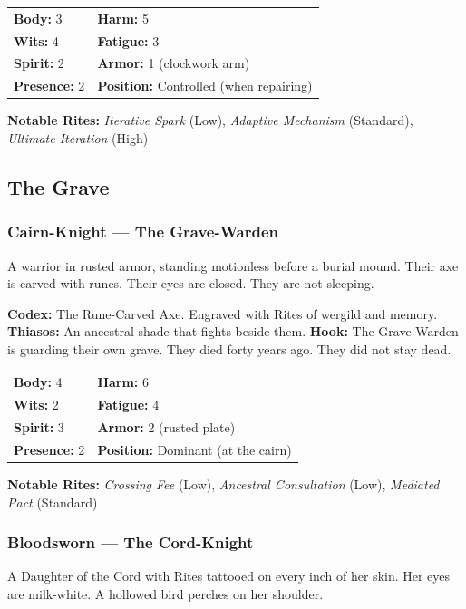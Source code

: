 \begin{tabular}{ll}
\textbf{Body:} 3 & \textbf{Harm:} 5 \\
\textbf{Wits:} 4 & \textbf{Fatigue:} 3 \\
\textbf{Spirit:} 2 & \textbf{Armor:} 1 (clockwork arm) \\
\textbf{Presence:} 2 & \textbf{Position:} Controlled (when repairing) \\
\end{tabular}

\textbf{Notable Rites:} \textit{Iterative Spark} (Low), \textit{Adaptive Mechanism} (Standard), \textit{Ultimate Iteration} (High)

\subsection{The Grave}

\subsubsection{Cairn-Knight — The Grave-Warden}

A warrior in rusted armor, standing motionless before a burial mound. Their axe is carved with runes. Their eyes are closed. They are not sleeping.

\textbf{Codex:} The Rune-Carved Axe. Engraved with Rites of wergild and memory.
\textbf{Thiasos:} An ancestral shade that fights beside them.
\textbf{Hook:} The Grave-Warden is guarding their own grave. They died forty years ago. They did not stay dead.

\begin{tabular}{ll}
\textbf{Body:} 4 & \textbf{Harm:} 6 \\
\textbf{Wits:} 2 & \textbf{Fatigue:} 4 \\
\textbf{Spirit:} 3 & \textbf{Armor:} 2 (rusted plate) \\
\textbf{Presence:} 2 & \textbf{Position:} Dominant (at the cairn) \\
\end{tabular}

\textbf{Notable Rites:} \textit{Crossing Fee} (Low), \textit{Ancestral Consultation} (Low), \textit{Mediated Pact} (Standard)

\subsubsection{Bloodsworn — The Cord-Knight}

A Daughter of the Cord with Rites tattooed on every inch of her skin. Her eyes are milk-white. A hollowed bird perches on her shoulder.

